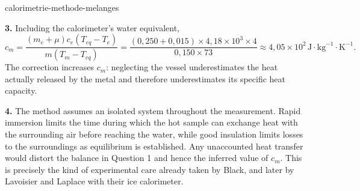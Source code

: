 \begin{exo}{calorimetrie-methode-melanges}
\begin{solution}
\textbf{3.} Including the calorimeter's water equivalent,
\[
c_m=\frac{(m_e+\mu)c_e(T_{eq}-T_e)}{m(T_m-T_{eq})}
=\frac{(0{,}250+0{,}015)\times4{,}18\times10^3\times4}{0{,}150\times73}
\approx4{,}05\times10^2\,\text{J}\!\cdot\!\text{kg}^{-1}\!\cdot\!\text{K}^{-1}.
\]
The correction increases $c_m$: neglecting the vessel underestimates the heat actually released by the metal and therefore underestimates its specific heat capacity.

\textbf{4.} The method assumes an isolated system throughout the measurement. Rapid immersion limits the time during which the hot sample can exchange heat with the surrounding air before reaching the water, while good insulation limits losses to the surroundings as equilibrium is established. Any unaccounted heat transfer would distort the balance in Question 1 and hence the inferred value of $c_m$. This is precisely the kind of experimental care already taken by Black, and later by Lavoisier and Laplace with their ice calorimeter.
\end{solution}
\end{exo}


